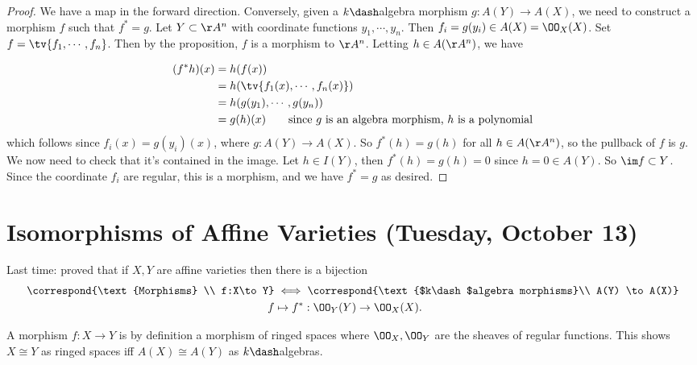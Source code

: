 \begin{proof}

We have a map in the forward direction. Conversely, given a
\(k\dash\)algebra morphism \(g:A(Y) \to A(X)\), we need to construct a
morphism \(f\) such that \(f^* = g\). Let \(Y\subset \AA^n\) with
coordinate functions \(y_1, \cdots, y_n\). Then
\(f_i = g(y_i) \in A(X) = \OO_X(X)\). Set \(f = \tv{f_1, \cdots, f_n}\).
Then by the proposition, \(f\) is a morphism to \(\AA^n\). Letting
\(h\in A(\AA^n)\), we have

\begin{align*}
(f^*h)(x) 
&= h(f(x)) \\
&= h(\tv{f_1(x) , \cdots, f_n(x)}) \\
&= h(g(y_1), \cdots, g(y_n)) \\ 
&= g(h)(x) \qquad\text{since $g$ is an algebra morphism, $h$ is a polynomial}
\end{align*} which follows since \(f_i(x) = g(y_i)(x)\), where
\(g:A(Y) \to A(X)\). So \(f^*(h) = g(h)\) for all \(h\in A(\AA^n)\), so
the pullback of \(f\) is \(g\). We now need to check that it's contained
in the image. Let \(h\in I(Y)\), then \(f^*(h) = g(h) = 0\) since
\(h = 0 \in A(Y)\). So \(\im f \subset Y\). Since the coordinate \(f_i\)
are regular, this is a morphism, and we have \(f^* = g\) as desired.

\end{proof}

\hypertarget{isomorphisms-of-affine-varieties-tuesday-october-13}{%
\section{Isomorphisms of Affine Varieties (Tuesday, October
13)}\label{isomorphisms-of-affine-varieties-tuesday-october-13}}

Last time: proved that if \(X, Y\) are affine varieties then there is a
bijection
\begin{align*}  
\correspond{\text{Morphisms} \\ f:X\to Y}
&\iff
\correspond{\text{$k\dash$algebra morphisms}\\ A(Y) \to A(X)}
\\
f & \mapsto f^*: \OO_Y(Y) \to \OO_X(X)
.\end{align*}

\begin{remark}

A morphism \(f:X\to Y\) is by definition a morphism of ringed spaces
where \(\OO_X, \OO_Y\) are the sheaves of regular functions. This shows
\(X\cong Y\) as ringed spaces iff \(A(X) \cong A(Y)\) as
\(k\dash\)algebras.

\end{remark}

